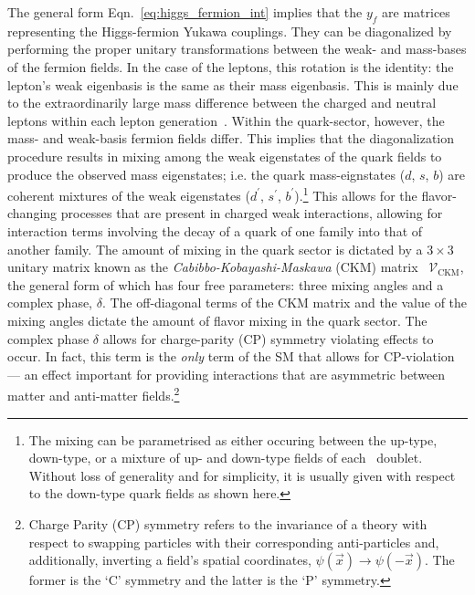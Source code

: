 The general form Eqn.~\ref{eq:higgs_fermion_int} implies that the $y_f$ are matrices representing the
Higgs-fermion Yukawa couplings. They can be diagonalized by performing the proper unitary
transformations between the weak- and mass-bases of the fermion fields. In the case of the leptons,
this rotation is the identity: the lepton's weak eigenbasis is the same as their mass eigenbasis.
This is mainly due to the extraordinarily large mass difference between the charged and neutral
leptons within each lepton generation~\cite{Akhmedov:2007fk}. Within the quark-sector,  however,
the mass- and weak-basis fermion fields differ. This implies that the diagonalization procedure results
in mixing among the weak eigenstates of the quark fields to produce the observed mass eigenstates; i.e. the quark mass-eignstates ($d$,
$s$, $b$) are
coherent mixtures of the weak eigenstates ($d^{\prime}$,
$s^{\prime}$, $b^{\prime}$).\footnote{The mixing can be parametrised as either occuring between
the up-type, down-type, or a mixture of up- and down-type fields of each \SUtwo~doublet. Without
loss of generality and for simplicity, it is usually given with respect to the down-type quark fields as shown
here.}
This allows for the flavor-changing processes that are present
in charged weak interactions, allowing for interaction terms involving the decay
of a quark of one family into that of another family. The amount of mixing in the quark sector
is dictated by a $3\times 3$ unitary matrix known as the \textit{Cabibbo-Kobayashi-Maskawa} (CKM)
matrix~\cite{Kobayashi:1973fv} $\mathcal{V}_{\text{CKM}}$, the general form of which has four free parameters: three mixing angles
and a complex phase, $\delta$. The off-diagonal terms of the CKM matrix and the value of the mixing angles
dictate the amount of flavor mixing in the quark sector. The complex phase $\delta$
allows for charge-parity (CP) symmetry violating effects to occur. In fact, this term is the \textit{only} term of the SM
that allows for CP-violation --- an effect important for providing interactions that are asymmetric
between matter and anti-matter fields.\footnote{Charge Parity (CP) symmetry refers to the invariance
	of a theory with respect to swapping particles with their corresponding anti-particles and, additionally,
	inverting a field's spatial coordinates, $\psi(\vec{x}) \rightarrow \psi(-\vec{x})$. The former
	is the `C' symmetry and the latter is the `P' symmetry.
}

